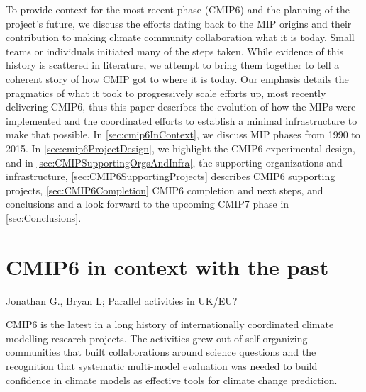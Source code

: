 \documentclass[gmd, preprint]{copernicus}
\newcommand{\mycomment}[1]{}
\def\cred#1{{\color{red}#1}}
\begin{document}
To provide context for the most recent phase (CMIP6) and the planning of the project’s future, we discuss the efforts dating back to the MIP origins and their contribution to making climate community collaboration what it is today. Small teams or individuals initiated many of the steps taken. While evidence of this history is scattered in literature, we attempt to bring them together to tell a coherent story of how CMIP got to where it is today. Our emphasis details the pragmatics of what it took to progressively scale efforts up, most recently delivering CMIP6, thus this paper describes the evolution of how the MIPs were implemented and the coordinated efforts to establish a minimal infrastructure to make that possible. In \autoref{sec:cmip6InContext}, we discuss MIP phases from 1990 to 2015. In \autoref{sec:cmip6ProjectDesign}, we highlight the CMIP6 experimental design, and in \autoref{sec:CMIPSupportingOrgsAndInfra}, the supporting organizations and infrastructure, \autoref{sec:CMIP6SupportingProjects} describes CMIP6 supporting projects, \autoref{sec:CMIP6Completion} CMIP6 completion and next steps, and conclusions and a look forward to the upcoming CMIP7 phase in \autoref{sec:Conclusions}.

\mycomment{
Mention CMIP6 Community MIPs - mentioned in CMIP5 section.
Durack+Tayloretal_CMIP6POverview_GMD-CMIP6SpecialIssue
https://docs.google.com/document/d/1Bxu2djLsB0blUUjr4qtwNpZWqMFXkTQRY8kOR_EJvlA/edit?skip_itp2_check=true&pli=1
}


\section{CMIP6 in context with the past}
\label{sec:cmip6InContext}
\cred{Jonathan G., Bryan L; Parallel activities in UK/EU?}

CMIP6 is the latest in a long history of internationally coordinated climate modelling research projects. The activities grew out of self-organizing communities that built collaborations around science questions and the recognition that systematic multi-model evaluation was needed to build confidence in climate models as effective tools for climate change prediction.
\end{document}
